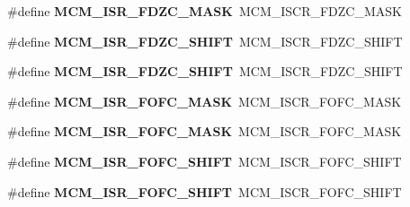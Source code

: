 \begin{DoxyCompactItemize}
\item 
\#define {\bfseries M\+C\+M\+\_\+\+I\+S\+R\+\_\+\+F\+D\+Z\+C\+\_\+\+M\+A\+SK}~M\+C\+M\+\_\+\+I\+S\+C\+R\+\_\+\+F\+D\+Z\+C\+\_\+\+M\+A\+SK\hypertarget{group__Backward__Compatibility__Symbols_ga610f581ddc6b9cc1e4b4847a99509a08}{}\label{group__Backward__Compatibility__Symbols_ga610f581ddc6b9cc1e4b4847a99509a08}

\item 
\#define {\bfseries M\+C\+M\+\_\+\+I\+S\+R\+\_\+\+F\+D\+Z\+C\+\_\+\+S\+H\+I\+FT}~M\+C\+M\+\_\+\+I\+S\+C\+R\+\_\+\+F\+D\+Z\+C\+\_\+\+S\+H\+I\+FT\hypertarget{group__Backward__Compatibility__Symbols_ga3fbed1f99af0d0916feebea373cfbb8b}{}\label{group__Backward__Compatibility__Symbols_ga3fbed1f99af0d0916feebea373cfbb8b}

\item 
\#define {\bfseries M\+C\+M\+\_\+\+I\+S\+R\+\_\+\+F\+D\+Z\+C\+\_\+\+S\+H\+I\+FT}~M\+C\+M\+\_\+\+I\+S\+C\+R\+\_\+\+F\+D\+Z\+C\+\_\+\+S\+H\+I\+FT\hypertarget{group__Backward__Compatibility__Symbols_ga3fbed1f99af0d0916feebea373cfbb8b}{}\label{group__Backward__Compatibility__Symbols_ga3fbed1f99af0d0916feebea373cfbb8b}

\item 
\#define {\bfseries M\+C\+M\+\_\+\+I\+S\+R\+\_\+\+F\+O\+F\+C\+\_\+\+M\+A\+SK}~M\+C\+M\+\_\+\+I\+S\+C\+R\+\_\+\+F\+O\+F\+C\+\_\+\+M\+A\+SK\hypertarget{group__Backward__Compatibility__Symbols_ga90b5519e0a496915707fc7c62a13a70a}{}\label{group__Backward__Compatibility__Symbols_ga90b5519e0a496915707fc7c62a13a70a}

\item 
\#define {\bfseries M\+C\+M\+\_\+\+I\+S\+R\+\_\+\+F\+O\+F\+C\+\_\+\+M\+A\+SK}~M\+C\+M\+\_\+\+I\+S\+C\+R\+\_\+\+F\+O\+F\+C\+\_\+\+M\+A\+SK\hypertarget{group__Backward__Compatibility__Symbols_ga90b5519e0a496915707fc7c62a13a70a}{}\label{group__Backward__Compatibility__Symbols_ga90b5519e0a496915707fc7c62a13a70a}

\item 
\#define {\bfseries M\+C\+M\+\_\+\+I\+S\+R\+\_\+\+F\+O\+F\+C\+\_\+\+S\+H\+I\+FT}~M\+C\+M\+\_\+\+I\+S\+C\+R\+\_\+\+F\+O\+F\+C\+\_\+\+S\+H\+I\+FT\hypertarget{group__Backward__Compatibility__Symbols_ga2140808617bd0d532f24a58a16eb87d7}{}\label{group__Backward__Compatibility__Symbols_ga2140808617bd0d532f24a58a16eb87d7}

\item 
\#define {\bfseries M\+C\+M\+\_\+\+I\+S\+R\+\_\+\+F\+O\+F\+C\+\_\+\+S\+H\+I\+FT}~M\+C\+M\+\_\+\+I\+S\+C\+R\+\_\+\+F\+O\+F\+C\+\_\+\+S\+H\+I\+FT\hypertarget{group__Backward__Compatibility__Symbols_ga2140808617bd0d532f24a58a16eb87d7}{}\label{group__Backward__Compatibility__Symbols_ga2140808617bd0d532f24a58a16eb87d7}


\end{DoxyCompactItemize}

